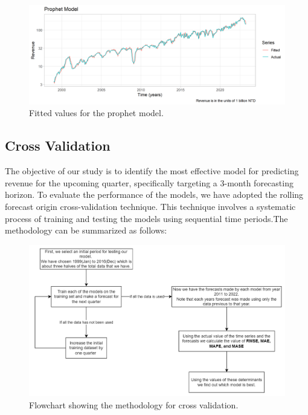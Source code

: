 \documentclass[
]{article}
\begin{document}
\begin{figure}
\centering
\includegraphics{Plots/fittedprophetplot.png}
\caption{Fitted values for the prophet model.}
\end{figure}

\hypertarget{cross-validation-1}{%
\subsection{Cross Validation}\label{cross-validation-1}}

The objective of our study is to identify the most effective model for
predicting revenue for the upcoming quarter, specifically targeting a
3-month forecasting horizon. To evaluate the performance of the models,
we have adopted the rolling forecast origin cross-validation technique.
This technique involves a systematic process of training and testing the
models using sequential time periods.The methodology can be summarized
as follows:

\begin{figure}
\centering
\includegraphics{Plots/crossvalidationflowchart.png}
\caption{Flowchart showing the methodology for cross validation.}
\end{figure}
\end{document}
